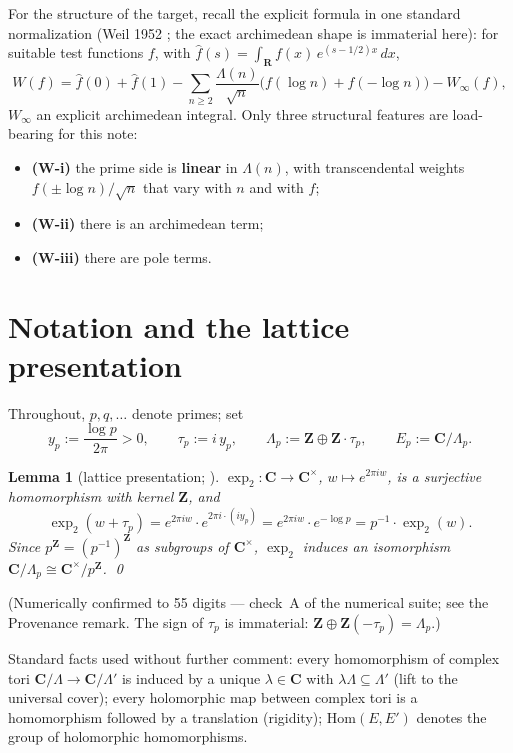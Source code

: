 \documentclass[11pt]{article}
\newtheorem{lemma}{Lemma}
\theoremstyle{definition}
\theoremstyle{remark}
\newcommand{\Z}{\mathbf{Z}}
\newcommand{\R}{\mathbf{R}}
\newcommand{\C}{\mathbf{C}}
\newcommand{\Hom}{\mathrm{Hom}}
\begin{document}
For the structure of the target, recall the explicit formula in one standard
normalization (Weil 1952 \cite{We52}; the exact archimedean shape is
immaterial here): for suitable test functions $f$, with
$\hat{f}(s) = \int_{\R} f(x)\, e^{(s-1/2)x}\, dx$,
\[
W(f) = \hat{f}(0) + \hat{f}(1)
 - \sum_{n\geq 2} \frac{\Lambda(n)}{\sqrt{n}}\bigl(f(\log n) + f(-\log n)\bigr)
 - W_\infty(f) ,
\]
$W_\infty$ an explicit archimedean integral. Only three structural features
are load-bearing for this note:

\begin{itemize}
\item \textbf{(W-i)} the prime side is \textbf{linear} in $\Lambda(n)$, with
transcendental weights $f(\pm\log n)/\sqrt{n}$ that vary with $n$ and with
$f$;
\item \textbf{(W-ii)} there is an archimedean term;
\item \textbf{(W-iii)} there are pole terms.
\end{itemize}

\section{Notation and the lattice presentation}
\label{sec:notation}

Throughout, $p, q, \dots$ denote primes; set
\[
y_p := \frac{\log p}{2\pi} > 0 , \qquad
\tau_p := i\, y_p , \qquad
\Lambda_p := \Z \oplus \Z\cdot\tau_p , \qquad
E_p := \C/\Lambda_p .
\]

\begin{lemma}[lattice presentation; {\cite[\S4.1.2]{CC26}}]
\label{lem:lattice}
$\exp_2\colon \C \to \C^\times$, $w \mapsto e^{2\pi i w}$, is a surjective
homomorphism with kernel $\Z$, and
\[
\exp_2(w + \tau_p) = e^{2\pi i w}\cdot e^{2\pi i \cdot (i y_p)}
 = e^{2\pi i w}\cdot e^{-\log p} = p^{-1}\cdot \exp_2(w) .
\]
Since $p^\Z = (p^{-1})^\Z$ as subgroups of $\C^\times$, $\exp_2$ induces an
isomorphism $\C/\Lambda_p \cong \C^\times/p^\Z$. \qed
\end{lemma}

(Numerically confirmed to 55 digits --- check~A of the numerical suite; see
the Provenance remark. The sign of $\tau_p$ is immaterial:
$\Z \oplus \Z(-\tau_p) = \Lambda_p$.)

Standard facts used without further comment: every homomorphism of complex
tori $\C/\Lambda \to \C/\Lambda'$ is induced by a unique $\lambda \in \C$
with $\lambda\Lambda \subseteq \Lambda'$ (lift to the universal cover); every
holomorphic map between complex tori is a homomorphism followed by a
translation (rigidity); $\Hom(E, E')$ denotes the group of holomorphic
homomorphisms.
\end{document}
